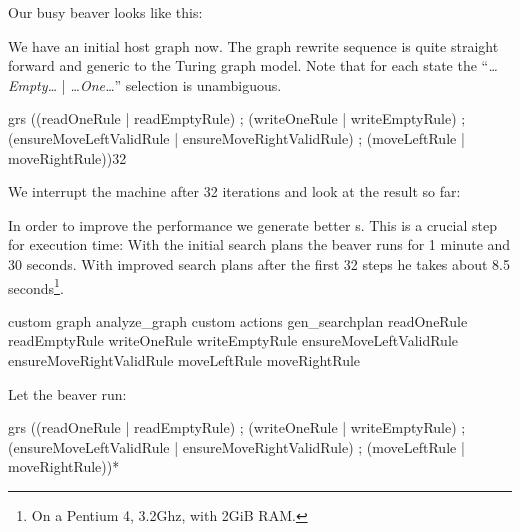 Our busy beaver looks like this:
\begin{center}
\end{center}
We have an initial host graph now. The graph rewrite sequence is quite straight forward and generic to the Turing graph model. Note that for each state the ``\emph{\dots Empty\dots} | \emph{\dots One\dots}'' selection is unambiguous.
\begin{grshell}[firstnumber=last]
  grs ((readOneRule | readEmptyRule) ; (writeOneRule | writeEmptyRule) ; (ensureMoveLeftValidRule | ensureMoveRightValidRule) ; (moveLeftRule | moveRightRule)){32}

\end{grshell}
We interrupt the machine after 32 iterations and look at the result so far:
\begin{center}
\end{center}
In order to improve the performance we generate better s. This is a crucial step for execution time: With the initial search plans the beaver runs for 1 minute and 30 seconds. With improved search plans after the first 32 steps he takes about 8.5 seconds\footnote{On a Pentium 4, 3.2Ghz, with 2GiB RAM.}.
\begin{grshell}[firstnumber=last]
custom graph analyze_graph
custom actions gen_searchplan readOneRule readEmptyRule writeOneRule writeEmptyRule ensureMoveLeftValidRule ensureMoveRightValidRule moveLeftRule moveRightRule

\end{grshell}

Let the beaver run:
\begin{grshell}[firstnumber=last]
  grs ((readOneRule | readEmptyRule) ; (writeOneRule | writeEmptyRule) ; (ensureMoveLeftValidRule | ensureMoveRightValidRule) ; (moveLeftRule | moveRightRule))*
\end{grshell}


